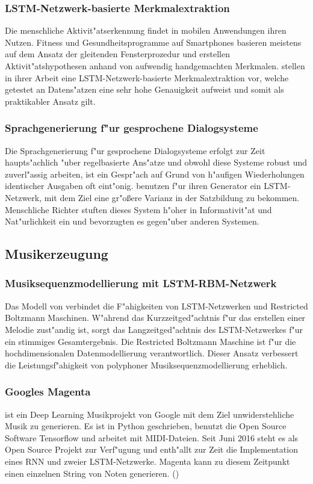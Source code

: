 {\subsubsection{LSTM-Netzwerk-basierte Merkmalextraktion}
Die menschliche Aktivit"atserkennung findet in mobilen Anwendungen ihren Nutzen. Fitness und Gesundheitsprogramme auf Smartphones basieren meistens auf dem Ansatz der gleitenden Fensterprozedur und erstellen Aktivit"atshypothesen anhand von aufwendig handgemachten Merkmalen. \cite{Chen} stellen in ihrer Arbeit eine LSTM-Netzwerk-basierte Merkmalextraktion vor, welche getestet an Datens"atzen eine sehr hohe Genauigkeit aufweist und somit als praktikabler Ansatz gilt.

\subsubsection{Sprachgenerierung f"ur gesprochene Dialogsysteme}
Die Sprachgenerierung f"ur gesprochene Dialogsysteme erfolgt zur Zeit haupts"achlich "uber regelbasierte Ans"atze und obwohl diese Systeme robust und zuverl"assig arbeiten, ist ein Gespr"ach auf Grund von h"aufigen Wiederholungen identischer Ausgaben oft eint"onig. \cite{Wen} benutzen f"ur ihren Generator ein LSTM-Netzwerk, mit dem Ziel eine gr"o{\ss}ere Varianz in der Satzbildung zu bekommen. Menschliche Richter stuften dieses System h"oher in Informativit"at und Nat"urlichkeit ein und bevorzugten es gegen"uber anderen Systemen.


\subsection{Musikerzeugung}

\subsubsection{Musiksequenzmodellierung mit LSTM-RBM-Netzwerk}
Das Modell von \cite{Lyu} verbindet die F"ahigkeiten von LSTM-Netzwerken und Restricted Boltzmann Maschinen. W"ahrend das Kurzzeitged"achtnis f"ur das erstellen einer Melodie zust"andig ist, sorgt das Langzeitged"achtnis des LSTM-Netzwerkes f"ur ein stimmiges Gesamtergebnis. Die Restricted Boltzmann Maschine ist f"ur die hochdimensionalen Datenmodellierung verantwortlich. Dieser Ansatz verbessert die Leistungsf"ahigkeit von polyphoner Musiksequenzmodellierung erheblich.

\subsubsection{Googles Magenta}
\cite{Magenta} ist ein Deep Learning Musikprojekt von Google mit dem Ziel unwiderstehliche Musik zu generieren. Es ist in Python geschrieben, benutzt die Open Source Software Tensorflow und arbeitet mit MIDI-Dateien. Seit Juni 2016 steht es als Open Source Projekt zur Verf"ugung und enth"allt zur Zeit die Implementation eines RNN und zweier LSTM-Netzwerke. Magenta kann zu diesem Zeitpunkt einen einzelnen String von Noten generieren. (\cite{Asimov})

}
